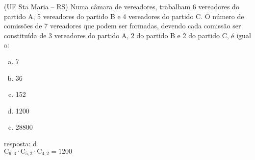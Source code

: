 \begin{ex}
(UF Sta Maria – RS) Numa câmara de vereadores, trabalham 6 vereadores do partido A, 5 vereadores do partido B e 4 vereadores do partido C. O número de comissões de 7 vereadores que podem ser formadas, devendo cada comissão ser constituída de 3 vereadores do partido A, 2 do partido B e 2 do partido C, é igual a:
   \begin{enumerate}[(a)]
   \item 7
   \item 36
   \item 152
   \item 1200
   \item 28800
   \end{enumerate}
     \begin{sol}
       resposta: d \\
       $\mathrm{C}_{6,3}\cdot\mathrm{C}_{5,2}\cdot\mathrm{C}_{4,2}=1200$
     \end{sol}
\end{ex}